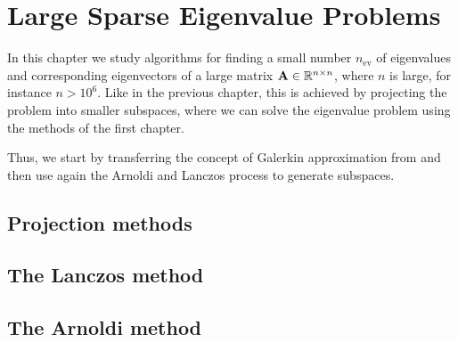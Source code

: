 \chapter{Large Sparse Eigenvalue Problems}
\label{chap:sparse-eigen}

\begin{intro}
  In this chapter we study algorithms for finding a small number
  $n_{\text{ev}}$ of eigenvalues and corresponding eigenvectors of a
  large matrix $\mathbf A\in\mathbb R^{n\times n}$, where $n$ is large, for instance
  $n>10^6$. Like in the previous chapter, this is achieved by
  projecting the problem into smaller subspaces, where we can solve
  the eigenvalue problem using the methods of the first chapter.

  Thus, we start by transferring the concept of Galerkin approximation
  from  and then use again the
  Arnoldi and Lanczos process to generate subspaces.
\end{intro}

\section{Projection methods}


\section{The Lanczos method}


\section{The Arnoldi method}



